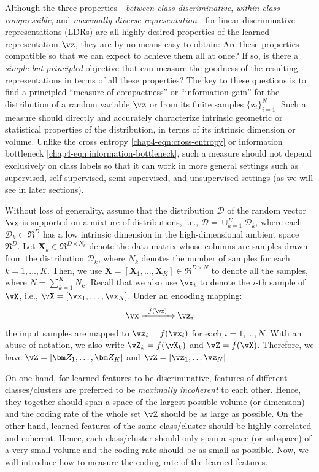 \documentclass[../../book-main.tex]{subfiles}
\begin{document}
Although the three properties---{\em between-class discriminative}, {\em
within-class compressible}, and {\em maximally diverse
representation}---for linear discriminative representations (LDRs)
are all highly desired properties  of the learned representation
$\vz$, they are by no means easy to obtain: Are these properties
compatible so that we can expect to achieve them all at once? If so,
is there a {\em simple but principled} objective that can measure the
goodness of the resulting representations in terms of all these
properties? The key to these questions {is to find} a principled
``measure of compactness'' or ``information gain''  for the
distribution of a random variable $\vz$ or from its finite samples
$\{\bm z_i\}_{i=1}^N$. Such a measure should directly and accurately
characterize intrinsic geometric or statistical properties of the
distribution, in terms of its intrinsic dimension or {volume}. Unlike
the cross entropy \eqref{chap4-eqn:cross-entropy} or information
bottleneck \eqref{chap4-eqn:information-bottleneck}, such a measure
should not depend exclusively on class labels so that it can work in
more general settings such as supervised, self-supervised,
semi-supervised, and unsupervised settings (as we will see in
later sections).

Without loss of generality, assume that the distribution $\mathcal D$
of the random vector $\vx$ is supported on a mixture of distributions,
i.e., $\mathcal D = \cup_{k=1}^K \mathcal{D}_k$,  where each
$\mathcal{D}_k \subset \Re^D$ has a low intrinsic dimension in the
high-dimensional ambient space $\Re^D$. Let $\bm X_k \in \Re^{D\times
N_k}$ denote the data matrix whose columns are samples drawn from the
distribution $\mathcal{D}_k$, where $N_k$ denotes the number of
samples for each $k=1,\dots,K$. Then, we use $\bm X=[\bm
X_1,\dots,\bm X_K] \in \Re^{D\times N}$ to denote all the samples,
where $N=\sum_{k=1}^K N_k$.
Recall that we also use $\vx_i$ to denote the $i$-th sample of $\vX$,
i.e., $\vX=[\vx_1,\dots,\vx_N] $. Under an encoding mapping:
\begin{equation}
    \vx  \xrightarrow{\hspace{2mm} f(\vx)\hspace{2mm}} \vz,
\end{equation}
the input samples are mapped to $\vz_i = f(\vx_i)$ for each
$i=1,\dots,N$. With an abuse of notation, we also write $\vZ_k =
f(\vX_k)$ and $\vZ = f(\vX)$. Therefore, we have $\vZ = [\bm
Z_1,\dots,\bm Z_K]$ and $\vZ = [\vz_1,\dots\vz_N]$.

On one hand, for learned features to be discriminative, features of
different classes/clusters are preferred to be {\em maximally
incoherent} to each other. Hence, they together should span a space
of the largest possible volume (or dimension) and the coding rate of
the whole set $\vZ$ should be as large as possible. On the other hand,
learned features of the same class/cluster should be highly
correlated and coherent. Hence, each class/cluster should only span a
space (or subspace) of a very small volume and the coding rate should
be as small as possible. Now, we will introduce how to measure the
coding rate of the learned features.
\end{document}
